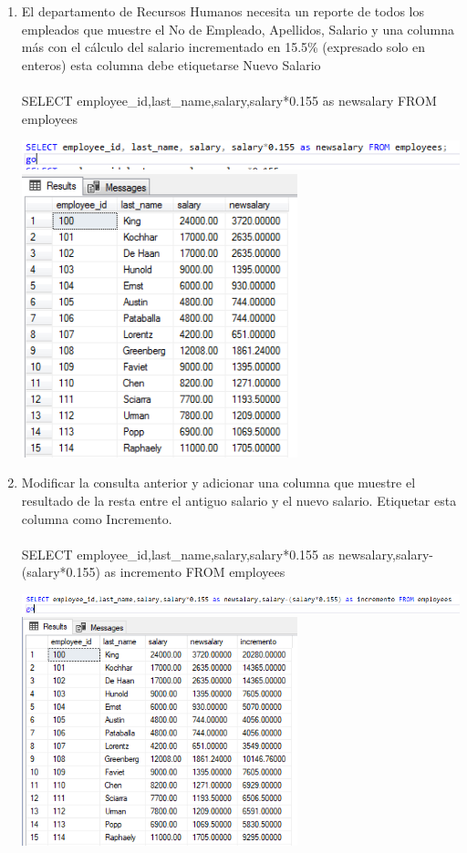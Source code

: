\begin{enumerate}[1.]
	\item El departamento de Recursos Humanos necesita un reporte de todos los empleados que muestre el No de Empleado, Apellidos, Salario y una columna más con el cálculo del salario incrementado en 15.5\% (expresado solo en enteros) esta columna debe etiquetarse Nuevo Salario
	\\
	\\SELECT employee\_id,last\_name,salary,salary*0.155 as newsalary FROM employees
	\begin{center}
	\includegraphics[width=17cm]{./Imagenes/actividad_05_02a}
	\includegraphics[width=8cm]{./Imagenes/actividad_05_02}
	\end{center}

	\item Modificar la consulta anterior y adicionar una columna que muestre el resultado de la resta entre el antiguo salario y el nuevo salario. Etiquetar esta columna como Incremento.
	\\
	\\SELECT employee\_id,last\_name,salary,salary*0.155 as newsalary,salary-(salary*0.155) as incremento FROM employees
	\begin{center}
	\includegraphics[width=17cm]{./Imagenes/actividad_05_03a}
	\includegraphics[width=8cm]{./Imagenes/actividad_05_03}
	\end{center}


\end{enumerate}
